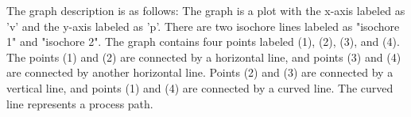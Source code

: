 The graph description is as follows: The graph is a plot with the x-axis labeled as 'v' and the y-axis labeled as 'p'. There are two isochore lines labeled as "isochore 1" and "isochore 2". The graph contains four points labeled (1), (2), (3), and (4). The points (1) and (2) are connected by a horizontal line, and points (3) and (4) are connected by another horizontal line. Points (2) and (3) are connected by a vertical line, and points (1) and (4) are connected by a curved line. The curved line represents a process path.